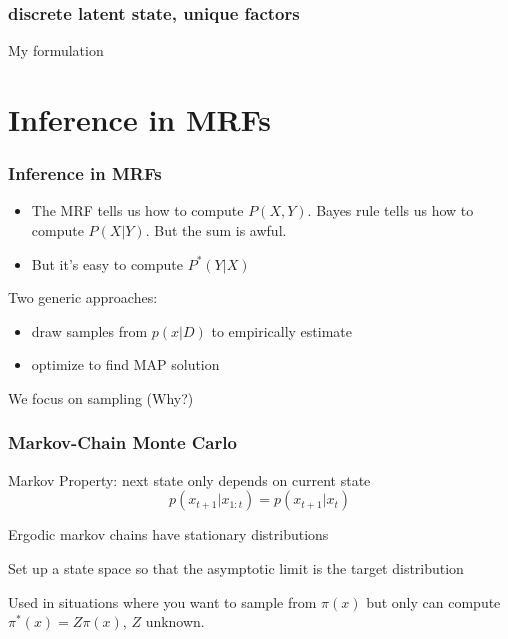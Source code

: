 \documentclass{beamer}
\begin{document}
\begin{frame}
\frametitle{discrete latent state, unique factors}
My formulation
\end{frame} 

\section{Inference in MRFs}

\begin{frame}
  \frametitle{Inference in MRFs}
  \begin{itemize}
  \item The MRF tells us how to compute $P(X, Y)$. Bayes rule
    tells us how to compute $P(X | Y)$. But the sum is awful. 
  \item But it's easy to compute $P^\ast(Y | X) $
  \end{itemize}
  Two generic approaches: 
  \begin{itemize}
  \item draw samples from $p(x | D)$ to empirically estimate 
  \item optimize to find MAP solution
  \end{itemize}
  \pause
  
  We focus on sampling (Why?) 
\end{frame}

\begin{frame}
  \frametitle{Markov-Chain Monte Carlo}
  Markov Property: next state only depends on current state
  \begin{equation*}
    p(x_{t+1} | x_{1:t}) = p(x_{t+1} | x_{t})
  \end{equation*}

  Ergodic markov chains have stationary distributions
  
  Set up a state space so that the asymptotic limit is the target distribution

  Used in situations where you want to sample from
  $\pi(x)$ but only can compute $\pi^\ast(x) = Z \pi(x)$, $Z$ unknown. 

\end{frame}
\end{document}
